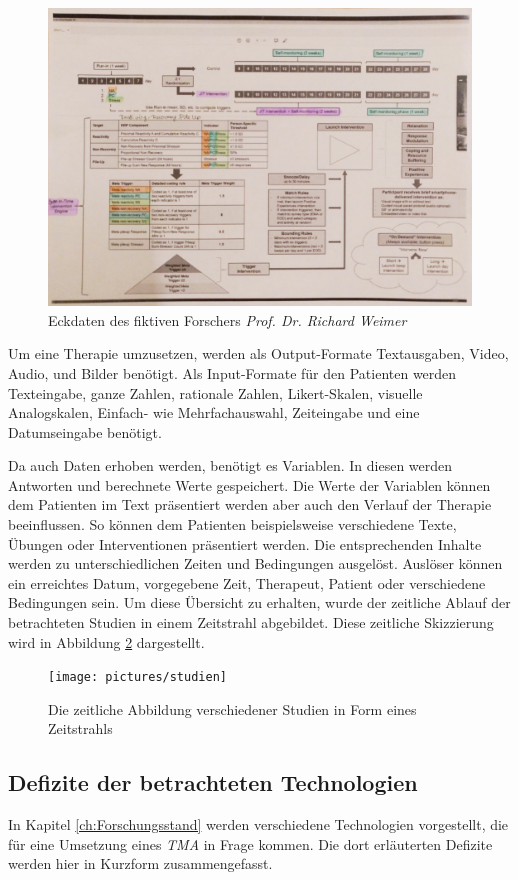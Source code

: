 \begin{figure}[h]
\centering
\includegraphics[width=1\textwidth]{pictures/studie}
\caption{Eckdaten des fiktiven Forschers \emph{Prof. Dr. Richard Weimer}}
\label{studie}
\end{figure}

Um eine Therapie umzusetzen, werden als Output-Formate Textausgaben, Video, Audio, und Bilder benötigt. Als Input-Formate für den Patienten werden Texteingabe, ganze Zahlen, rationale Zahlen, Likert-Skalen, visuelle Analogskalen, Einfach- wie Mehrfachauswahl, Zeiteingabe und eine Datumseingabe benötigt. 
 
Da auch Daten erhoben werden, benötigt es Variablen. In diesen werden Antworten und berechnete Werte gespeichert. Die Werte der Variablen können dem Patienten im Text präsentiert werden aber auch den Verlauf der Therapie beeinflussen. So können dem Patienten beispielsweise verschiedene Texte, Übungen oder Interventionen präsentiert werden. Die entsprechenden Inhalte werden zu unterschiedlichen Zeiten und Bedingungen ausgelöst. Auslöser können ein erreichtes Datum, vorgegebene Zeit, Therapeut, Patient oder verschiedene Bedingungen sein. Um diese Übersicht zu erhalten, wurde der zeitliche Ablauf der betrachteten Studien in einem Zeitstrahl abgebildet. Diese zeitliche Skizzierung wird in Abbildung \ref{studien} dargestellt.

\begin{figure}[h]
\centering
\texttt{[image: pictures/studien]}
\caption{Die zeitliche Abbildung verschiedener Studien in Form eines Zeitstrahls}
\label{studien}
\end{figure}

\subsection{Defizite der betrachteten Technologien}
In Kapitel \ref{ch:Forschungsstand} werden verschiedene Technologien vorgestellt, die für eine Umsetzung eines \emph{TMA} in Frage kommen. Die dort erläuterten Defizite werden hier in Kurzform zusammengefasst.

